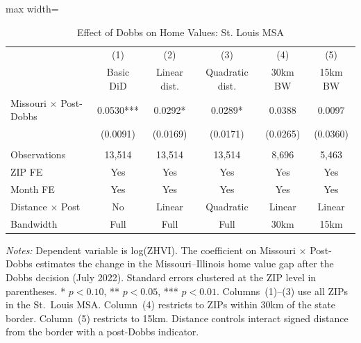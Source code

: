 \begin{table}[H]
\centering
\caption{Effect of Dobbs on Home Values: St. Louis MSA}
\label{tab:main}
\begin{threeparttable}
\begin{adjustbox}{max width=\textwidth}
\begin{tabular}{lccccc}
\toprule
& (1) & (2) & (3) & (4) & (5) \\
& Basic DiD & Linear dist. & Quadratic dist. & 30km BW & 15km BW \\
\midrule
Missouri $\times$ Post-Dobbs & 0.0530*** & 0.0292* & 0.0289* & 0.0388 & 0.0097 \\
& (0.0091) & (0.0169) & (0.0171) & (0.0265) & (0.0360) \\
\\
Observations & 13,514 & 13,514 & 13,514 & 8,696 & 5,463 \\
ZIP FE & Yes & Yes & Yes & Yes & Yes \\
Month FE & Yes & Yes & Yes & Yes & Yes \\
Distance $\times$ Post & No & Linear & Quadratic & Linear & Linear \\
Bandwidth & Full & Full & Full & 30km & 15km \\
\bottomrule
\end{tabular}
\end{adjustbox}
\end{threeparttable}
\par\vspace{0.3em}
\begin{minipage}{\textwidth}
\small \textit{Notes:} Dependent variable is log(ZHVI). The coefficient on Missouri $\times$ Post-Dobbs estimates the change in the Missouri--Illinois home value gap after the Dobbs decision (July 2022). Standard errors clustered at the ZIP level in parentheses. * $p<0.10$, ** $p<0.05$, *** $p<0.01$. Columns~(1)--(3) use all ZIPs in the St.\ Louis MSA\@. Column~(4) restricts to ZIPs within 30km of the state border. Column~(5) restricts to 15km. Distance controls interact signed distance from the border with a post-Dobbs indicator.
\end{minipage}
\end{table}
